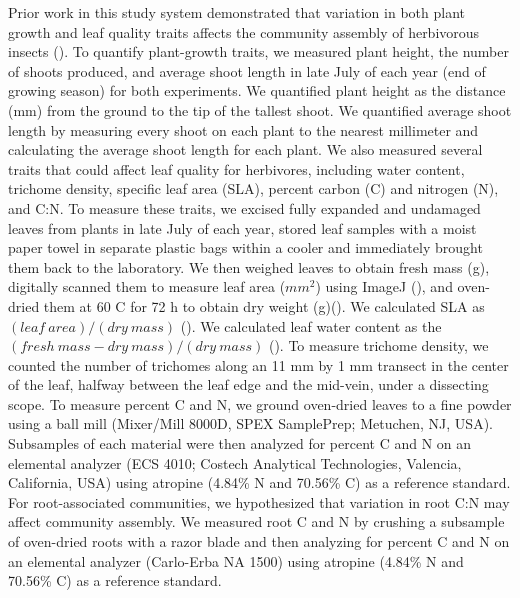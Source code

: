 \documentclass[11pt]{article}
\begin{document}
Prior work in this study system demonstrated that variation in both
plant growth and leaf quality traits affects the community assembly of herbivorous insects (\citealt{Barbour_2015}). To quantify
plant-growth traits, we measured plant height, the number of shoots
produced, and average shoot length in late July of each year (end of
growing season) for both experiments. We quantified plant height as the
distance (mm) from the ground to the tip of the tallest shoot. We
quantified average shoot length by measuring every shoot on each plant
to the nearest millimeter and calculating the average shoot length for
each plant. We also measured several traits that could affect leaf
quality for herbivores, including water content, trichome density,
specific leaf area (SLA), percent carbon (C) and nitrogen (N), and
C:N. To measure these traits, we excised fully expanded and undamaged
leaves from plants in late July of each year, stored leaf samples with a
moist paper towel in separate plastic bags within a cooler and
immediately brought them back to the laboratory. We then weighed leaves
to obtain fresh mass (g), digitally scanned them to measure leaf area
(\(mm^2\)) using ImageJ (\citealt{abramoff2004image}), and oven-dried them at
60 \degree C for 72 h to obtain dry weight (g)(\citealt{cornelissen2003handbook}). We calculated
SLA as $(leaf\ area)/(dry\ mass)$  (\citealt{cornelissen2003handbook}). We calculated leaf water content as
the $(fresh\ mass - dry\ mass)/(dry\ mass)$ (\citealt{cornelissen2003handbook}). To
measure trichome density, we counted the number of trichomes along an 11
mm by 1 mm transect in the center of the leaf, halfway between the leaf
edge and the mid-vein, under a dissecting scope. To measure percent C
and N, we ground oven-dried leaves to a fine powder using a ball mill
(Mixer/Mill 8000D, SPEX SamplePrep; Metuchen, NJ, USA). Subsamples of
each material were then analyzed for percent C and N on an elemental
analyzer (ECS 4010; Costech Analytical Technologies, Valencia,
California, USA) using atropine (4.84\% N and 70.56\% C) as a reference
standard. For root-associated communities, we hypothesized that
variation in root C:N may affect community assembly. We measured root C
and N by crushing a subsample of oven-dried roots with a razor blade and
then analyzing for percent C and N on an elemental analyzer (Carlo-Erba
NA 1500) using atropine (4.84\% N and 70.56\% C) as a reference
standard.
\end{document}
